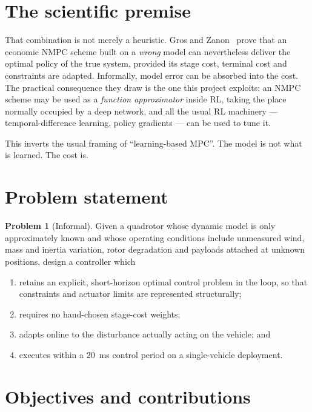 \documentclass[11pt,a4paper,twoside,openright]{report}
\theoremstyle{plain}
\theoremstyle{definition}
\newtheorem{problem}[theorem]{Problem}
\theoremstyle{remark}
\begin{document}
	\section{The scientific premise}

	That combination is not merely a heuristic. Gros and Zanon~\cite{gros2020data}
	prove that an economic NMPC scheme built on a \emph{wrong} model can nevertheless
	deliver the optimal policy of the true system, provided its stage cost, terminal
	cost and constraints are adapted. Informally, model error can be absorbed into
	the cost. The practical consequence they draw is the one this project exploits:
	an NMPC scheme may be used as a \emph{function approximator} inside RL, taking
	the place normally occupied by a deep network, and all the usual RL machinery ---
	temporal-difference learning, policy gradients --- can be used to tune it.

	This inverts the usual framing of ``learning-based MPC''. The model is not what
	is learned. The cost is.

	\section{Problem statement}

	\begin{problem}[Informal]
		Given a quadrotor whose dynamic model is only approximately known and whose
		operating conditions include unmeasured wind, mass and inertia variation, rotor
		degradation and payloads attached at unknown positions, design a controller
		which
		\begin{enumerate}[nosep,label=(\roman*)]
			\item retains an explicit, short-horizon optimal control problem in the loop,
			so that constraints and actuator limits are represented structurally;
			\item requires no hand-chosen stage-cost weights;
			\item adapts online to the disturbance actually acting on the vehicle; and
			\item executes within a \SI{20}{\milli\second} control period on a
			single-vehicle deployment.
		\end{enumerate}
	\end{problem}

	\section{Objectives and contributions}
\end{document}
